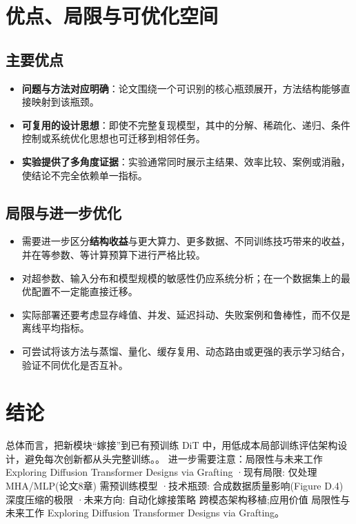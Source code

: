 \documentclass[UTF8,11pt,a4paper]{ctexart}
\newcommand{\term}[1]{\textbf{\textcolor{mainblue}{#1}}}
\begin{document}
\section{优点、局限与可优化空间}
\subsection{主要优点}
\begin{itemize}
\item \term{问题与方法对应明确}：论文围绕一个可识别的核心瓶颈展开，方法结构能够直接映射到该瓶颈。
\item \term{可复用的设计思想}：即使不完整复现模型，其中的分解、稀疏化、递归、条件控制或系统优化思想也可迁移到相邻任务。
\item \term{实验提供了多角度证据}：实验通常同时展示主结果、效率比较、案例或消融，使结论不完全依赖单一指标。
\end{itemize}

\subsection{局限与进一步优化}
\begin{itemize}
\item 需要进一步区分\term{结构收益}与更大算力、更多数据、不同训练技巧带来的收益，并在等参数、等计算预算下进行严格比较。
\item 对超参数、输入分布和模型规模的敏感性仍应系统分析；在一个数据集上的最优配置不一定能直接迁移。
\item 实际部署还要考虑显存峰值、并发、延迟抖动、失败案例和鲁棒性，而不仅是离线平均指标。
\item 可尝试将该方法与蒸馏、量化、缓存复用、动态路由或更强的表示学习结合，验证不同优化是否互补。
\end{itemize}

\section{结论}
总体而言，把新模块“嫁接”到已有预训练 DiT 中，用低成本局部训练评估架构设计，避免每次创新都从头完整训练。。 进一步需要注意：局限性与未来工作 Exploring Diffusion Transformer Designs via Grafting ·现有局限: 仅处理MHA/MLP(论文8章) 需预训练模型 ·技术瓶颈: 合成数据质量影响(Figure D.4) 深度压缩的极限 ·未来方向: 自动化嫁接策略 跨模态架构移植;应用价值 局限性与未来工作 Exploring Diffusion Transformer Designs via Grafting。
\end{document}

